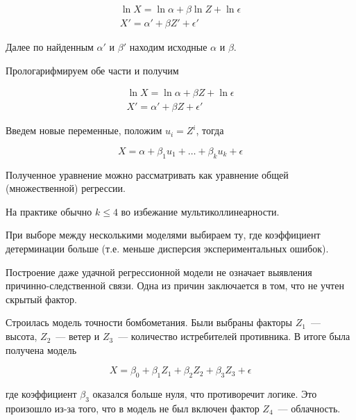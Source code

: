 \begin{equation*}
  \begin{aligned}
    \ln X = \ln \alpha + \beta \ln Z + \ln \epsilon
  \\
    X' = \alpha' + \beta Z' + \epsilon'
  \end{aligned}
\end{equation*}

Далее по найденным \(\alpha'\) и \(\beta'\) находим исходные \(\alpha\) и
\(\beta\).


Прологарифмируем обе части и получим

\begin{equation*}
  \begin{aligned}
    \ln X = \ln \alpha + \beta Z + \ln \epsilon
  \\
    X' = \alpha' + \beta Z + \epsilon'
  \end{aligned}
\end{equation*}


Введем новые переменные, положим \(u_i = Z^i\), тогда

\begin{equation*}
  X = \alpha + \beta_1 u_1 + \dotsc + \beta_k u_k + \epsilon
\end{equation*}

Полученное уравнение можно рассматривать как уравнение общей (множественной)
регрессии.

\begin{remark}
  На практике обычно \(k \le 4\) во избежание мультиколлинеарности.
\end{remark}

\begin{remark}
  При выборе между несколькими моделями выбираем ту, где коэффициент
  детерминации больше (т.е. меньше дисперсия экспериментальных ошибок).
\end{remark}

\begin{remark}
  Построение даже удачной регрессионной модели не означает выявления
  причинно-следственной связи. Одна из причин заключается в том, что не учтен
  скрытый фактор.
\end{remark}

\begin{example}
  Строилась модель точности бомбометания. Были выбраны факторы \(Z_1\)~---
  высота, \(Z_2\)~--- ветер и \(Z_3\)~--- количество истребителей противника.
  В итоге была получена модель

  \begin{equation*}
    X = \beta_0 + \beta_1 Z_1 + \beta_2 Z_2 + \beta_3 Z_3 + \epsilon
  \end{equation*}

  где коэффициент \(\beta_3\) оказался больше нуля, что противоречит логике. Это
  произошло из-за того, что в модель не был включен фактор \(Z_4\)~---
  облачность.
\end{example}

